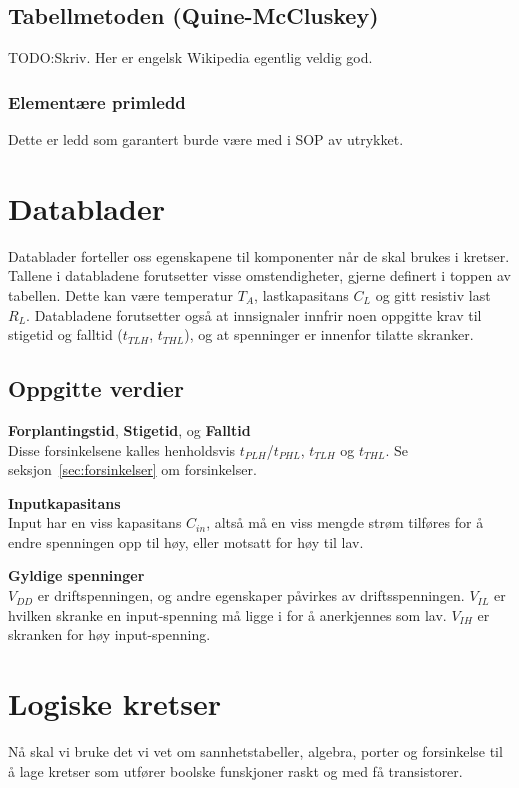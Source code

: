 \documentclass[12pt,a4paper,norsk]{article}
\begin{document}
\subsection{Tabellmetoden (Quine-McCluskey)}
TODO\@:Skriv. Her er engelsk Wikipedia egentlig veldig god.

\subsubsection{Elementære primledd}
Dette er ledd som garantert burde være med i SOP av utrykket.

\section{Datablader}\label{sec:datablader}
Datablader forteller oss egenskapene til komponenter når de skal brukes i kretser.
Tallene i databladene forutsetter visse omstendigheter, gjerne definert i toppen
av tabellen. Dette kan være temperatur $T_{A}$, lastkapasitans $C_{L}$ og gitt
resistiv last $R_{L}$. Databladene forutsetter også at innsignaler innfrir noen
oppgitte krav til stigetid og falltid ($t_{TLH}$, $t_{THL}$), og at spenninger
er innenfor tilatte skranker.

\subsection{Oppgitte verdier}
\textbf{Forplantingstid}, \textbf{Stigetid}, og \textbf{Falltid}\\
Disse forsinkelsene kalles henholdsvis $t_{PLH}$/$t_{PHL}$, $t_{TLH}$ og
$t_{THL}$. Se seksjon~\ref{sec:forsinkelser} om forsinkelser.

\textbf{Inputkapasitans}\\
Input har en viss kapasitans $C_{in}$, altså må en viss mengde strøm tilføres for å endre
spenningen opp til høy, eller motsatt for høy til lav.

\textbf{Gyldige spenninger}\\
$V_{DD}$ er driftspenningen, og andre egenskaper påvirkes av driftsspenningen.
$V_{IL}$ er hvilken skranke en input-spenning må ligge i for å anerkjennes som
lav. $V_{IH}$ er skranken for høy input-spenning.

\section{Logiske kretser}\label{sec:logic_circuits}
Nå skal vi bruke det vi vet om sannhetstabeller, algebra, porter og forsinkelse
til å lage kretser som utfører boolske funskjoner raskt og med få transistorer.
\end{document}
